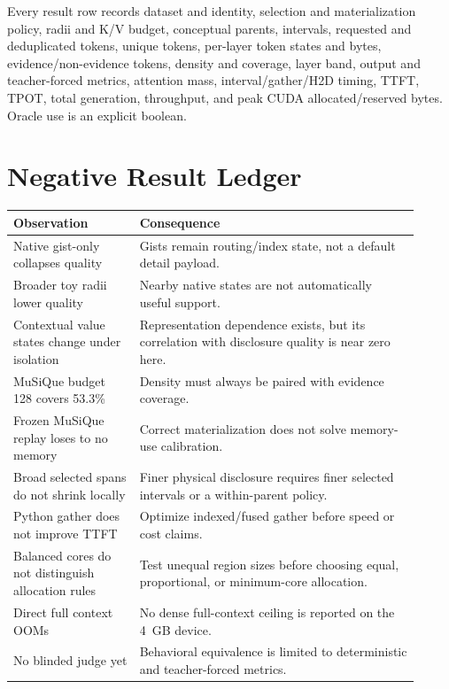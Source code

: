 \documentclass[11pt]{article}
\begin{document}
Every result row records dataset and identity, selection and materialization policy, radii and K/V
budget, conceptual parents, intervals, requested and deduplicated tokens, unique tokens, per-layer
token states and bytes, evidence/non-evidence tokens, density and coverage, layer band, output and
teacher-forced metrics, attention mass, interval/gather/H2D timing, TTFT, TPOT, total generation,
throughput, and peak CUDA allocated/reserved bytes.  Oracle use is an explicit boolean.

\section{Negative Result Ledger}

\begin{table}[H]
\centering
\small
\begin{tabular}{p{0.29\linewidth}p{0.62\linewidth}}
\toprule
Observation & Consequence \\
\midrule
Native gist-only collapses quality & Gists remain routing/index state, not a default detail payload. \\
Broader toy radii lower quality & Nearby native states are not automatically useful support. \\
Contextual value states change under isolation & Representation dependence exists, but its correlation with disclosure quality is near zero here. \\
MuSiQue budget 128 covers 53.3\% & Density must always be paired with evidence coverage. \\
Frozen MuSiQue replay loses to no memory & Correct materialization does not solve memory-use calibration. \\
Broad selected spans do not shrink locally & Finer physical disclosure requires finer selected intervals or a within-parent policy. \\
Python gather does not improve TTFT & Optimize indexed/fused gather before speed or cost claims. \\
Balanced cores do not distinguish allocation rules & Test unequal region sizes before choosing equal, proportional, or minimum-core allocation. \\
Direct full context OOMs & No dense full-context ceiling is reported on the 4~GB device. \\
No blinded judge yet & Behavioral equivalence is limited to deterministic and teacher-forced metrics. \\
\bottomrule
\end{tabular}
\end{table}



\end{document}
